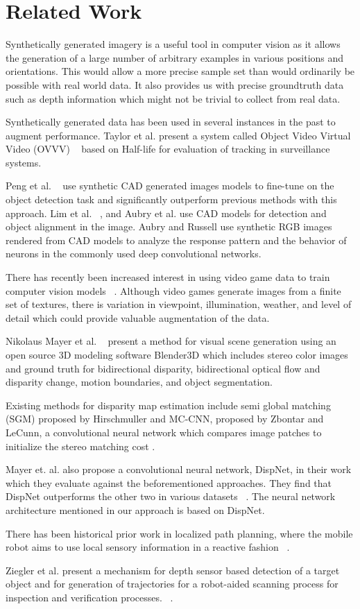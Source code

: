 \section{Related Work}
Synthetically generated imagery is a useful tool in computer vision as it allows the generation of a large number of arbitrary examples in various positions and orientations. This would allow a more precise sample set than would ordinarily be possible with real world data. It also provides us with precise groundtruth data such as depth information which might not be trivial to collect from real data.

Synthetically generated data has been used in several instances in the past to augment performance. Taylor et al. present a system called Object Video Virtual Video (OVVV) ~\cite{Taylor_2007} based on Half-life for evaluation of tracking in surveillance systems. 
 
Peng et al. ~\cite{PengSAS14} use synthetic CAD generated images models to fine-tune on the object detection task and significantly outperform previous methods with this approach. Lim et al. ~\cite{Lim2013}, and Aubry et al. use CAD models for detection and object alignment in the image. Aubry and Russell use synthetic RGB images rendered from CAD models to analyze the response pattern and the behavior of neurons in the commonly used deep convolutional networks.

There has recently been increased interest in using video game data to train computer vision models ~\cite{Shafaei_LS16}. Although video games generate images from a finite set of textures, there is variation in viewpoint, illumination, weather, and level of detail which could provide valuable augmentation of the data. 

Nikolaus Mayer et al. ~\cite{MayerIHFCDB15} present a method for visual scene generation using an open source 3D modeling software Blender3D which includes stereo color images and ground truth for bidirectional disparity, bidirectional optical flow and disparity change, motion boundaries, and object segmentation.

Existing methods for disparity map estimation include semi global matching (SGM) proposed by Hirschmuller \cite{Hirschmuller} and MC-CNN, proposed by Zbontar and LeCunn, a convolutional neural network which compares image patches to initialize the stereo matching cost \cite{ZbontarL15}.

Mayer et. al. also propose a convolutional neural network, DispNet, in their work which they evaluate against the beforementioned approaches. They find that DispNet outperforms the other two in various datasets ~\cite{MayerIHFCDB15}. The neural network architecture mentioned in our approach is based on DispNet.

There has been historical prior work in localized path planning, where the mobile robot aims to use local sensory information in a reactive fashion ~\cite{Rimon1998}.

Ziegler et al. present a mechanism for depth sensor based detection of a target object and for generation of trajectories for a robot-aided scanning process for inspection and verification processes. ~\cite{Ziegler2018}.
